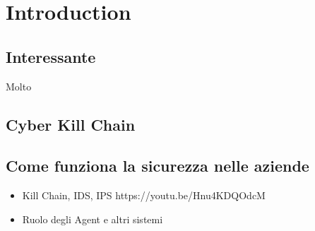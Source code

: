 \chapter{Introduction}

\section{Interessante}
Molto \cite{aws_inforce_malware}

\section{Cyber Kill Chain}

\section{Come funziona la sicurezza nelle aziende}
\begin{itemize}
    \item Kill Chain, IDS, IPS https://youtu.be/Hnu4KDQOdcM
    \item Ruolo degli Agent e altri sistemi
\end{itemize}